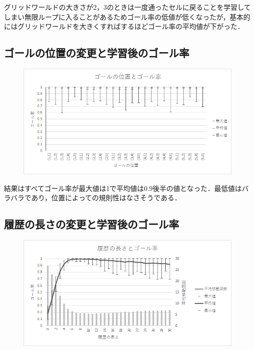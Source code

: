\documentclass[a4j,11pt]{jarticle}
\begin{document}
グリッドワールドの大きさが2，3のときは一度通ったセルに戻ることを学習してしまい無限ループに入ることがあるためゴール率の低値が低くなったが，基本的にはグリッドワールドを大きくすればするほどゴール率の平均値が下がった．

\subsection{ゴールの位置の変更と学習後のゴール率}

\begin{figure}[ht]
  \begin{center}
    \includegraphics[scale=1.5]{img/valGoal.png}
  \end{center}
\end{figure}

結果はすべてゴール率が最大値は1で平均値は0.9後半の値となった．最低値はバラバラであり，位置によっての規則性はなさそうである．

\newpage

\subsection{履歴の長さの変更と学習後のゴール率}

\begin{figure}[ht]
  \begin{center}
    \includegraphics[scale=1.5]{img/valT.png}
  \end{center}
\end{figure}
\end{document}

